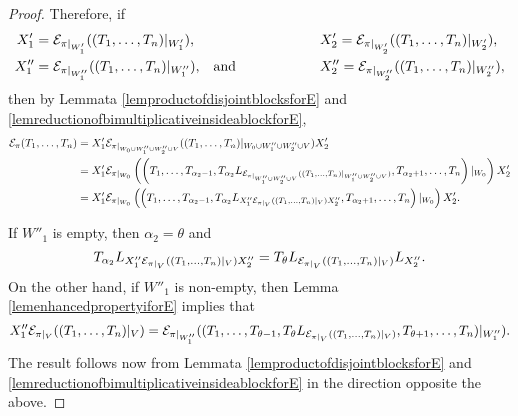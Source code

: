 \begin{proof}
			Therefore, if
			\begin{align*}
				X'_1 &= \mathcal{E}_{\pi|_{W'_1}}((T_1,\ldots, T_n)|_{W'_1}), & & X'_2 = \mathcal{E}_{\pi|_{W'_2}}((T_1,\ldots, T_n)|_{W'_2}), \\
				X''_1 &= \mathcal{E}_{\pi|_{W''_1}}((T_1,\ldots, T_n)|_{W''_1}), & \text{and} \qquad \qquad \qquad & X''_2 = \mathcal{E}_{\pi|_{W''_2}}((T_1,\ldots, T_n)|_{W''_2}),
			\end{align*} 
			then by Lemmata \ref{lemproductofdisjointblocksforE} and \ref{lemreductionofbimultiplicativeinsideablockforE},
			\begin{align*}
				\mathcal{E}_\pi(T_1,\ldots, T_n)
				&= X'_1 \mathcal{E}_{\pi|_{W_0 \cup W''_1 \cup W''_2 \cup V}}((T_1,\ldots, T_n)|_{W_0 \cup W''_1 \cup W''_2 \cup V})X'_2 \\
				&= X'_1 \mathcal{E}_{\pi|_{W_0 }}\left(\left(T_1,\ldots, T_{\alpha_2 - 1}, T_{\alpha_2}L_{\mathcal{E}_{\pi|_{W''_1 \cup W''_2 \cup V}}((T_1, \ldots, T_n)|_ {W''_1 \cup W''_2 \cup V})}, T_{\alpha_2+1},\ldots, T_n\right)|_{W_0}\right)X'_2 \\
				&= X'_1\mathcal{E}_{\pi|_{W_0 }}\left(\left(T_1,\ldots, T_{\alpha_2 - 1}, T_{\alpha_2} L_{X''_1 \mathcal{E}_{\pi|_{V}}((T_1, \ldots, T_n)|_ {V})
				X''_2}, T_{\alpha_2+1},\ldots, T_n\right)|_{W_0}\right)X'_2.
			\end{align*}

			If $W''_1$ is empty, then $\alpha_2 = \theta$ and 
			\[
				T_{\alpha_2} L_{X''_1
					\mathcal{E}_{\pi|_{V}}((T_1, \ldots, T_n)|_ {V})
				X''_2} = T_{\theta} L_{\mathcal{E}_{\pi|_{V}}((T_1, \ldots, T_n)|_ {V})} L_{X''_2}.
			\]
			On the other hand, if $W''_1$ is non-empty, then Lemma \ref{lemenhancedpropertyiforE} implies that
			\[
				X''_1\mathcal{E}_{\pi|_{V}}((T_1, \ldots, T_n)|_ {V}) = \mathcal{E}_{\pi|_{W''_1}}((T_1, \ldots, T_{\theta - 1}, T_\theta L_{\mathcal{E}_{\pi|_{V}}((T_1, \ldots, T_n)|_ {V})}, T_{\theta + 1}, \ldots, T_n)|_ {W''_1}).
			\] 
			The result follows now from Lemmata \ref{lemproductofdisjointblocksforE} and \ref{lemreductionofbimultiplicativeinsideablockforE} in the direction opposite the above.





\end{proof}
